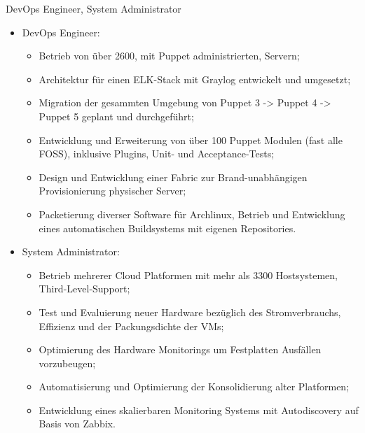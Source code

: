 %
  {DevOps Engineer, System Administrator
\begin{itemize}
  \item DevOps Engineer:
    \begin{itemize}
      \item Betrieb von über 2600, mit Puppet administrierten, Servern;
      \item Architektur für einen ELK-Stack mit Graylog entwickelt und umgesetzt;
      \item Migration der gesammten Umgebung von Puppet 3 -> Puppet 4 -> Puppet 5  geplant und durchgeführt;
      \item Entwicklung und Erweiterung von über 100 Puppet Modulen (fast alle FOSS), inklusive Plugins, Unit- und Acceptance-Tests;
      \item Design und Entwicklung einer Fabric zur Brand-unabhängigen Provisionierung physischer Server;
      \item Packetierung diverser Software für Archlinux, Betrieb und Entwicklung eines automatischen Buildsystems mit eigenen Repositories.
    \end{itemize}
  \item System Administrator:
    \begin{itemize}
      \item Betrieb mehrerer Cloud Platformen mit mehr als 3300 Hostsystemen, Third-Level-Support;
      \item Test und Evaluierung neuer Hardware bezüglich des Stromverbrauchs, Effizienz und der Packungsdichte der VMs;
      \item Optimierung des Hardware Monitorings um Festplatten Ausfällen vorzubeugen;
      \item Automatisierung und Optimierung der Konsolidierung alter Platformen;
      \item Entwicklung eines skalierbaren Monitoring Systems mit Autodiscovery auf Basis von Zabbix.
    \end{itemize}
\end{itemize}}

